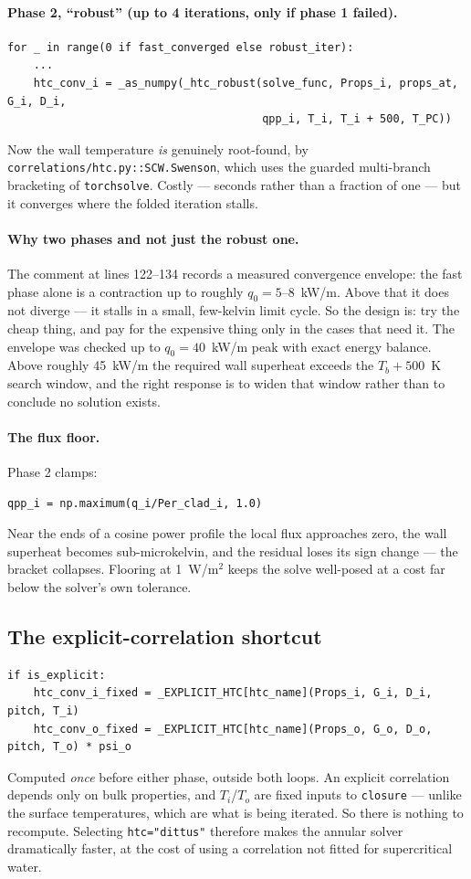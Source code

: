 \documentclass[11pt]{article}
\newcommand{\code}[1]{\texttt{#1}}
\begin{document}
\paragraph{Phase 2, ``robust'' (up to 4 iterations, only if phase 1 failed).}
\begin{lstlisting}
for _ in range(0 if fast_converged else robust_iter):
    ...
    htc_conv_i = _as_numpy(_htc_robust(solve_func, Props_i, props_at, G_i, D_i,
                                       qpp_i, T_i, T_i + 500, T_PC))
\end{lstlisting}
Now the wall temperature \emph{is} genuinely root-found, by
\code{correlations/htc.py::SCW.Swenson}, which uses the guarded multi-branch bracketing
of \code{torchsolve}. Costly --- seconds rather than a fraction of one --- but it
converges where the folded iteration stalls.

\paragraph{Why two phases and not just the robust one.} The comment at lines 122--134
records a measured convergence envelope: the fast phase alone is a contraction up to
roughly $q_0 = 5$--$8$~kW/m. Above that it does not diverge --- it stalls in a small,
few-kelvin limit cycle. So the design is: try the cheap thing, and pay for the expensive
thing only in the cases that need it. The envelope was checked up to $q_0 = 40$~kW/m
peak with exact energy balance. Above roughly 45~kW/m the required wall superheat exceeds
the $T_b + 500$~K search window, and the right response is to widen that window rather
than to conclude no solution exists.

\paragraph{The flux floor.} Phase 2 clamps:
\begin{lstlisting}
qpp_i = np.maximum(q_i/Per_clad_i, 1.0)
\end{lstlisting}
Near the ends of a cosine power profile the local flux approaches zero, the wall superheat
becomes sub-microkelvin, and the residual loses its sign change --- the bracket collapses.
Flooring at 1~W/m$^2$ keeps the solve well-posed at a cost far below the solver's own
tolerance.

\subsection{The explicit-correlation shortcut}
\begin{lstlisting}
if is_explicit:
    htc_conv_i_fixed = _EXPLICIT_HTC[htc_name](Props_i, G_i, D_i, pitch, T_i)
    htc_conv_o_fixed = _EXPLICIT_HTC[htc_name](Props_o, G_o, D_o, pitch, T_o) * psi_o
\end{lstlisting}
Computed \emph{once} before either phase, outside both loops. An explicit correlation
depends only on bulk properties, and $T_i$/$T_o$ are fixed inputs to \code{closure} ---
unlike the surface temperatures, which are what is being iterated. So there is nothing to
recompute. Selecting \code{htc="dittus"} therefore makes the annular solver dramatically
faster, at the cost of using a correlation not fitted for supercritical water.
\end{document}
